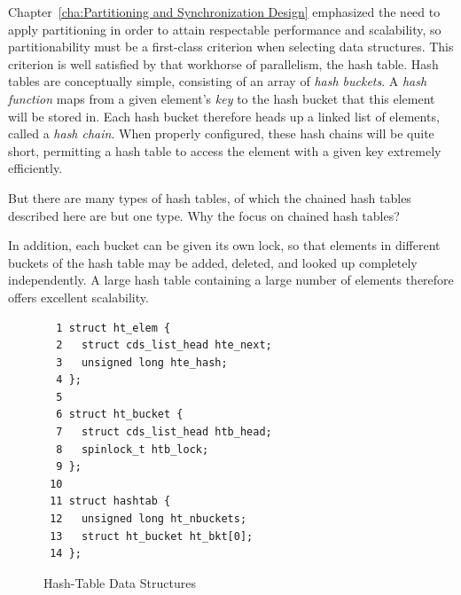 Chapter~\ref{cha:Partitioning and Synchronization Design}
emphasized the need to apply partitioning in order to attain
respectable performance and scalability, so partitionability
must be a first-class criterion when selecting data structures.
This criterion is well satisfied by that workhorse of parallelism,
the hash table.
Hash tables are conceptually simple, consisting of an array of
\emph{hash buckets}.
A \emph{hash function} maps from a given element's \emph{key}
to the hash bucket that this element will be stored in.
Each hash bucket therefore heads up a linked list of elements,
called a \emph{hash chain}.
When properly configured, these hash chains will be quite short,
permitting a hash table to access the element with a given key
extremely efficiently.

\QuickQuiz{}
	But there are many types of hash tables, of which the chained
	hash tables described here are but one type.
	Why the focus on chained hash tables?
 \QuickQuizEnd

In addition, each bucket can be given its own lock, so that
elements in different buckets of the hash table may be added,
deleted, and looked up completely independently.
A large hash table containing a large number of elements therefore
offers excellent scalability.

\begin{figure}[tb]
{ \scriptsize
\begin{verbatim}
  1 struct ht_elem {
  2   struct cds_list_head hte_next;
  3   unsigned long hte_hash;
  4 };
  5 
  6 struct ht_bucket {
  7   struct cds_list_head htb_head;
  8   spinlock_t htb_lock;
  9 };
 10 
 11 struct hashtab {
 12   unsigned long ht_nbuckets;
 13   struct ht_bucket ht_bkt[0];
 14 };
\end{verbatim}
}
\caption{Hash-Table Data Structures}
\label{fig:datastruct:Hash-Table Data Structures}
\end{figure}


